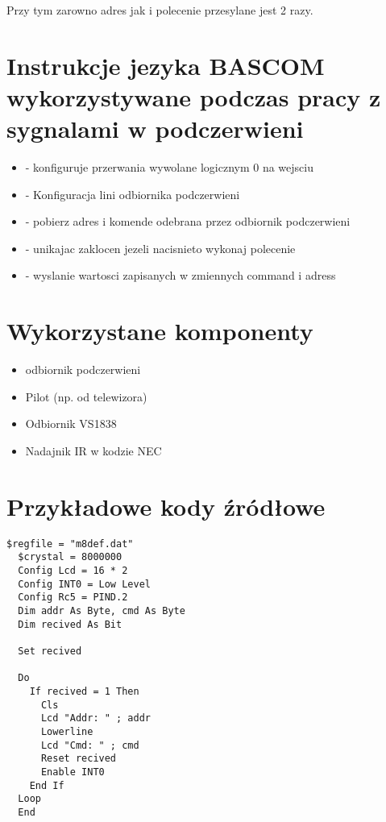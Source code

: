 \documentclass{article}
\begin{document}
Przy tym zarowno adres jak i polecenie przesylane jest 2 razy.

\section{Instrukcje jezyka BASCOM wykorzystywane podczas pracy z sygnalami w podczerwieni}

\begin{itemize}
  \item {} - konfiguruje przerwania wywolane logicznym 0 na wejsciu 
  \item {} - Konfiguracja lini odbiornika podczerwieni
  \item {} - pobierz adres i komende odebrana przez odbiornik podczerwieni
  \item {} - unikajac zaklocen jezeli nacisnieto  wykonaj polecenie
  \item {} - wyslanie wartosci zapisanych w zmiennych command i adress
\end{itemize}

\section{Wykorzystane komponenty}
\begin{itemize}
  \item odbiornik podczerwieni
  \item Pilot (np. od telewizora)
  \item Odbiornik VS1838
  \item Nadajnik IR w kodzie NEC
\end{itemize}

\section{Przykładowe kody źródłowe}

\begin{lstlisting}[language=VBScript , caption=Kod odbierajacy sygnal w kodzie RC5]
  $regfile = "m8def.dat"
  $crystal = 8000000
  Config Lcd = 16 * 2
  Config INT0 = Low Level
  Config Rc5 = PIND.2
  Dim addr As Byte, cmd As Byte
  Dim recived As Bit

  Set recived

  Do 
    If recived = 1 Then
      Cls
      Lcd "Addr: " ; addr
      Lowerline
      Lcd "Cmd: " ; cmd
      Reset recived
      Enable INT0
    End If
  Loop
  End
\end{lstlisting}
\end{document}
